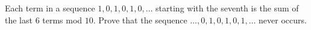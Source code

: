 Each term in a sequence $1, 0, 1, 0, 1, 0, \ldots$ starting with the seventh is the sum of the last $6$ terms mod $10$. Prove that the sequence $\ldots, 0, 1, 0, 1, 0, 1, \ldots$ never occurs.
